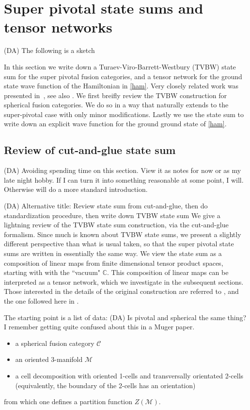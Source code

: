 \documentclass[12pt,a4paper]{article}
\newcommand{\cc}{\mathbb{C}}
\newcommand{\mcc}{\mathcal{C}}
\newcommand{\mcm}{\mathcal{M}}
\newcommand{\dave}[1]{{\color{ao(english)}\footnotesize{(DA) #1}}}
\begin{document}
\section{Super pivotal state sums and tensor networks} 
\label{state_sums}

\dave{The following is a sketch}

In this section we write down a Turaev-Viro-Barrett-Westbury (TVBW) state sum for the super pivotal fusion categories\cite{Turaev1992,Barrett1996}, 
and a tensor network for the ground state wave function of the Hamiltonian in \eqref{ham}.
Very closely related work was presented in~\cite{bhardwaj2016}, 
see also \cite{Bultinck2017, upcoming-paper?}.
We first breifly review the TVBW construction for spherical fusion categories. 
We do so in a way that naturally extends to the super-pivotal case with only minor modifications.
Lastly we use the state sum to write down an explicit wave function for the ground ground state of \eqref{ham}.

\subsection{Review of cut-and-glue state sum}
\dave{Avoiding spending time on this section. 
View it as notes for now or as my late night hobby.
If I can turn it into something reasonable at some point, I will. 
Otherwise will do a more standard introduction.}

\dave{Alternative title: Review state sum from cut-and-glue,
then do standardization procedure,
then write down TVBW state sum}
We give a lightning review of the TVBW state sum construction, via the cut-and-glue formalism.
Since much is known about TVBW state sums, 
we present a slightly different perspective than what is usual taken,
so that the super pivotal state sums are written in essentially the same way.
We view the state sum as a composition of linear maps from finite dimensional tensor product spaces, starting with with the ``vacuum" $\cc$. 
This composition of linear maps can be interpreted as a tensor network, 
which we investigate in the subsequent sections.
Those interested in the details of the original construction are referred to \cite{Turaev1992,Barrett1996}, 
and the one followed here in \cite{Walker2006}. 

The starting point is a list of data:
\dave{Is pivotal and spherical the same thing?
I remember getting quite confused about this in a Muger paper.}
\begin{itemize}
\item a spherical fusion category $\mcc$
\item an oriented 3-manifold $\mcm$
\item a cell decomposition with oriented 1-cells and transversally orientated 2-cells (equivalently, the boundary of the 2-cells has an orientation)
\end{itemize} 
from which one defines a partition function $Z(\mcm)$. 
\end{document}
